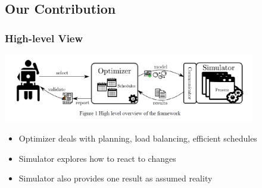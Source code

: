 

\subsection{Our Contribution}

\begin{frame}
\frametitle{High-level View}
\includegraphics[width=11cm]{imagesfieldservice/highleveloverview}
\begin{itemize}
\item Optimizer deals with planning, load balancing, efficient schedules
\item Simulator explores how to react to changes
\item Simulator also provides one result as assumed reality
\end{itemize}
\end{frame}

